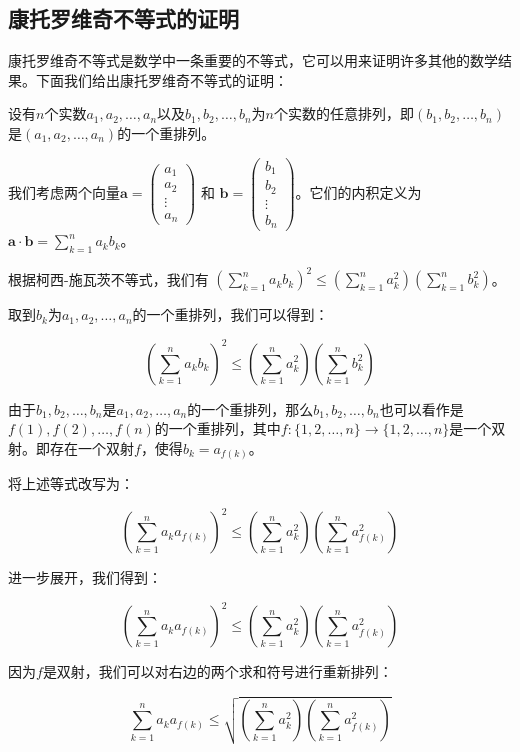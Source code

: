 \documentclass[UTF8]{ctexart}
\begin{document}
\subsection*{康托罗维奇不等式的证明}

康托罗维奇不等式是数学中一条重要的不等式，它可以用来证明许多其他的数学结果。下面我们给出康托罗维奇不等式的证明：

设有$n$个实数$a_1, a_2, \dots, a_n$以及$b_1, b_2, \dots, b_n$为$n$个实数的任意排列，即$(b_1, b_2, \dots, b_n)$是$(a_1, a_2, \dots, a_n)$的一个重排列。

我们考虑两个向量$ \mathbf{a} = \begin{pmatrix} a_1 \\ a_2 \\ \vdots \\ a_n \end{pmatrix} $ 和 $\mathbf{b} = \begin{pmatrix} b_1 \\ b_2 \\ \vdots \\ b_n \end{pmatrix} $。它们的内积定义为 $\mathbf{a} \cdot \mathbf{b} = \sum_{k=1}^{n} a_k b_k$。

根据柯西-施瓦茨不等式，我们有 $\left( \sum_{k=1}^{n} a_k b_k \right)^2 \leq \left( \sum_{k=1}^{n} a_k^2 \right) \left( \sum_{k=1}^{n} b_k^2 \right)$。

取到$b_k$为$a_1, a_2, \dots, a_n$的一个重排列，我们可以得到：

\[
\left( \sum_{k=1}^{n} a_k b_k \right)^2 \leq \left( \sum_{k=1}^{n} a_k^2 \right) \left( \sum_{k=1}^{n} b_k^2 \right)
\]

由于$b_1, b_2, \dots, b_n$是$a_1, a_2, \dots, a_n$的一个重排列，那么$b_1, b_2, \dots, b_n$也可以看作是$f(1), f(2), \dots, f(n)$的一个重排列，其中$f:\{1,2,\dots,n\} \rightarrow \{1,2,\dots,n\}$是一个双射。即存在一个双射$f$，使得$b_k=a_{f(k)}$。

将上述等式改写为：

\[
\left( \sum_{k=1}^{n} a_k a_{f(k)} \right)^2 \leq \left( \sum_{k=1}^{n} a_k^2 \right) \left( \sum_{k=1}^{n} a_{f(k)}^2 \right)
\]

进一步展开，我们得到：

\[
\left( \sum_{k=1}^{n} a_k a_{f(k)} \right)^2 \leq \left( \sum_{k=1}^{n} a_k^2 \right) \left( \sum_{k=1}^{n} a_{f(k)}^2 \right)
\]

因为$f$是双射，我们可以对右边的两个求和符号进行重新排列：

\[
\sum_{k=1}^{n} a_k a_{f(k)} \leq \sqrt{\left( \sum_{k=1}^{n} a_k^2 \right) \left( \sum_{k=1}^{n} a_{f(k)}^2 \right)}
\]
\end{document}
